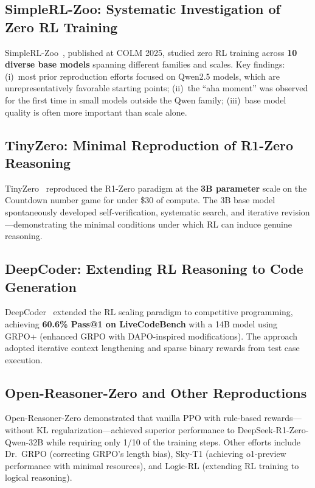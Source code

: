 \documentclass[12pt,a4paper]{report}
\theoremstyle{definition}
\begin{document}
\subsection{SimpleRL-Zoo: Systematic Investigation of Zero RL Training}

SimpleRL-Zoo~\cite{zeng2025simplerl}, published at COLM 2025, studied zero RL training across \textbf{10 diverse base models} spanning different families and scales. Key findings: (i)~most prior reproduction efforts focused on Qwen2.5 models, which are unrepresentatively favorable starting points; (ii)~the ``aha moment'' was observed for the first time in small models outside the Qwen family; (iii)~base model quality is often more important than scale alone.

\subsection{TinyZero: Minimal Reproduction of R1-Zero Reasoning}

TinyZero~\cite{wen2025tinyzero} reproduced the R1-Zero paradigm at the \textbf{3B parameter} scale on the Countdown number game for under \$30 of compute. The 3B base model spontaneously developed self-verification, systematic search, and iterative revision---demonstrating the minimal conditions under which RL can induce genuine reasoning.

\subsection{DeepCoder: Extending RL Reasoning to Code Generation}

DeepCoder~\cite{xu2025deepcoder} extended the RL scaling paradigm to competitive programming, achieving \textbf{60.6\% Pass@1 on LiveCodeBench} with a 14B model using GRPO+ (enhanced GRPO with DAPO-inspired modifications). The approach adopted iterative context lengthening and sparse binary rewards from test case execution.

\subsection{Open-Reasoner-Zero and Other Reproductions}

Open-Reasoner-Zero demonstrated that vanilla PPO with rule-based rewards---without KL regularization---achieved superior performance to DeepSeek-R1-Zero-Qwen-32B while requiring only 1/10 of the training steps. Other efforts include Dr.\ GRPO (correcting GRPO's length bias), Sky-T1 (achieving o1-preview performance with minimal resources), and Logic-RL (extending RL training to logical reasoning).
\end{document}
